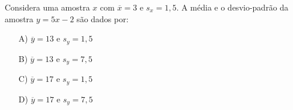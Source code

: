 Considera uma amostra $x$ com $\overline{x} = 3$ e $s_x = 1,5$. A média e o desvio-padrão da amostra $y=5x-2$ são dados por:
\begin{enumerate}
\item [A)] $\overline{y} = 13$ e $s_y = 1,5$
\item [B)] $\overline{y} = 13$ e $s_y = 7,5$
\item [C)] $\overline{y} = 17$ e $s_y = 1,5$
\item [D)] $\overline{y} = 17$ e $s_y = 7,5$
\end{enumerate}

